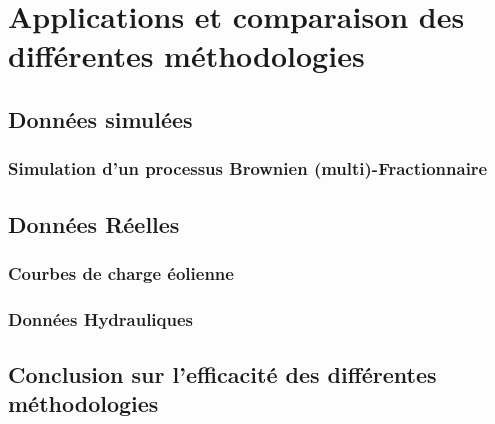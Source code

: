 \chapter{Applications et comparaison des différentes méthodologies}
\minitoc%


\section{Données simulées}

\subsection{Simulation d'un processus Brownien (multi)-Fractionnaire}

\section{Données Réelles}

\subsection{Courbes de charge éolienne}

\subsection{Données Hydrauliques}

\section{Conclusion sur l'efficacité des différentes méthodologies}